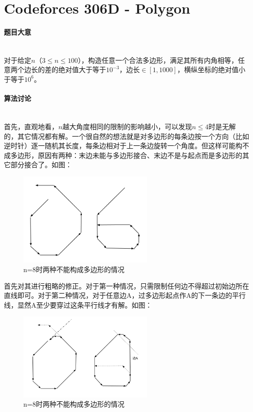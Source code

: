 \documentclass[UTF8]{ctexart}
\newcommand{\myparagraph}[1]{\paragraph{#1}\mbox{}\\}
\theoremstyle{nonumberplain}
\begin{document}
	\section{Codeforces 306D - Polygon}
	
		\myparagraph{题目大意}
		
			对于给定$n$（$3 \leq n \leq 100$），构造任意一个合法多边形，满足其所有内角相等，任意两个边长的差的绝对值大于等于$10^{-3}$，边长$\in [1,1000]$，横纵坐标的绝对值小于等于$10^6$。
		
		\myparagraph{算法讨论}
		
			首先，直观地看，$n$越大角度相同的限制的影响越小，可以发现$n \leq 4$时是无解的，其它情况都有解。一个很自然的想法就是对多边形的每条边按一个方向（比如逆时针）逐一随机其长度，每条边相对于上一条边旋转一个角度。但这样可能构不成多边形，原因有两种：末边未能与多边形接合、末边不是与起点而是多边形的其它部分接合了。如图：
			
			\begin{figure}[ht]
				\centering
				\includegraphics[width=0.6\textwidth]{fig306d_1.png}
				\caption{n=8时两种不能构成多边形的情况}
			\end{figure}
			
			首先对其进行粗略的修正。对于第一种情况，只需限制任何边不得超过初始边所在直线即可。对于第二种情况，对于任意边A，过多边形起点作A的下一条边的平行线，显然A至少要穿过这条平行线才有解。如图：
			
			\begin{figure}[ht]
				\centering
				\includegraphics[width=0.6\textwidth]{fig306d_2.png}
				\caption{n=8时两种不能构成多边形的情况}
			\end{figure}
			
\end{document}
